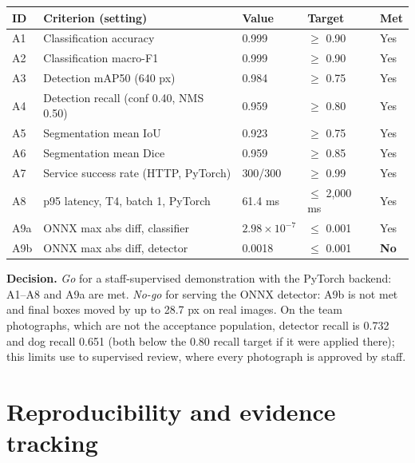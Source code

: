 \documentclass[11pt,a4paper]{article}
\begin{document}
{\small\begin{tabularx}{\linewidth}{@{}P{0.9cm} Y P{2.0cm} P{1.8cm} P{1.2cm}@{}}\toprule
ID & Criterion (setting) & Value & Target & Met\\\midrule
A1 & Classification accuracy & 0.999 & $\ge$ 0.90 & Yes\\
A2 & Classification macro-F1 & 0.999 & $\ge$ 0.90 & Yes\\
A3 & Detection mAP50 (640 px) & 0.984 & $\ge$ 0.75 & Yes\\
A4 & Detection recall (conf 0.40, NMS 0.50) & 0.959 & $\ge$ 0.80 & Yes\\
A5 & Segmentation mean IoU & 0.923 & $\ge$ 0.75 & Yes\\
A6 & Segmentation mean Dice & 0.959 & $\ge$ 0.85 & Yes\\
A7 & Service success rate (HTTP, PyTorch) & 300/300 & $\ge$ 0.99 & Yes\\
A8 & p95 latency, T4, batch 1, PyTorch & 61.4 ms & $\le$ 2,000 ms & Yes\\
A9a & ONNX max abs diff, classifier & $2.98\times10^{-7}$ & $\le$ 0.001 & Yes\\
A9b & ONNX max abs diff, detector & 0.0018 & $\le$ 0.001 & \textbf{No}\\\bottomrule\end{tabularx}}

\textbf{Decision.} \emph{Go} for a staff-supervised demonstration with the PyTorch backend: A1--A8 and A9a are met. \emph{No-go} for serving the ONNX detector: A9b is not met and final boxes moved by up to 28.7 px on real images. On the team photographs, which are not the acceptance population, detector recall is 0.732 and dog recall 0.651 (both below the 0.80 recall target if it were applied there); this limits use to supervised review, where every photograph is approved by staff.

\section{Reproducibility and evidence tracking}\label{sec:repro}
\end{document}
